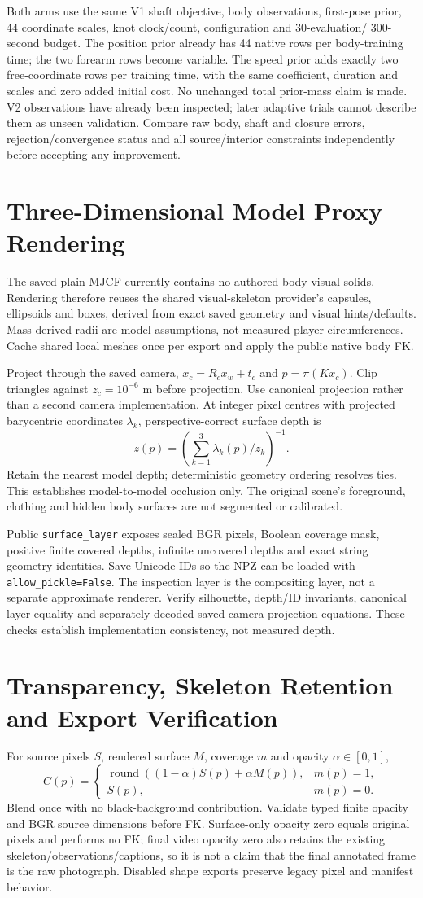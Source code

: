 \documentclass[11pt,letterpaper]{article}
\newcommand{\code}[1]{\nolinkurl{#1}}\newcommand{\hash}[1]{{\footnotesize\nolinkurl{#1}}}
\newcommand{\chapterpage}[1]{\clearpage\section{#1}}
\begin{document}
Both arms use the same V1 shaft objective, body observations, first-pose prior,
44 coordinate scales, knot clock/count, configuration and 30-evaluation/
300-second budget. The position prior already has 44 native rows per body-training time;
the two forearm rows become variable. The speed prior adds exactly two
free-coordinate rows per training time, with the same coefficient, duration
and scales and zero added initial cost. No unchanged total prior-mass claim
is made. V2 observations have already been inspected; later
adaptive trials cannot describe them as unseen validation. Compare raw body,
shaft and closure errors, rejection/convergence status and all source/interior
constraints independently before accepting any improvement.
\chapterpage{Three-Dimensional Model Proxy Rendering}
The saved plain MJCF currently contains no authored body visual solids.
Rendering therefore reuses the shared visual-skeleton provider's capsules,
ellipsoids and boxes, derived from exact saved geometry and visual hints/defaults.
Mass-derived radii are model assumptions, not measured player circumferences.
Cache shared local meshes once per export and apply the public native body FK.

Project through the saved camera, $x_c=R_c x_w+t_c$ and
$p=\pi(Kx_c)$. Clip triangles against $z_c=10^{-6}$ m before projection.
Use canonical projection rather than a second camera implementation.
At integer pixel centres with projected barycentric coordinates $\lambda_k$,
perspective-correct surface depth is
\[
z(p)=\left(\sum_{k=1}^{3}\lambda_k(p)/z_k\right)^{-1}.
\]
Retain the nearest model depth; deterministic geometry ordering resolves ties.
This establishes model-to-model occlusion only. The original scene's foreground,
clothing and hidden body surfaces are not segmented or calibrated.

Public \code{surface_layer} exposes sealed BGR pixels, Boolean coverage mask,
positive finite covered depths, infinite uncovered depths and exact string
geometry identities. Save Unicode IDs so the NPZ can be loaded with
\code{allow_pickle=False}. The inspection layer is the compositing layer,
not a separate approximate renderer. Verify silhouette, depth/ID invariants,
canonical layer equality and separately decoded saved-camera projection equations.
These checks establish implementation consistency, not measured depth.
\chapterpage{Transparency, Skeleton Retention and Export Verification}
For source pixels $S$, rendered surface $M$, coverage $m$ and opacity
$\alpha\in[0,1]$,
\[
C(p)=\begin{cases}\operatorname{round}((1-\alpha)S(p)+\alpha M(p)),&m(p)=1,\\S(p),&m(p)=0.\end{cases}
\]
Blend once with no black-background contribution. Validate typed finite opacity
and BGR source dimensions before FK. Surface-only opacity zero equals original
pixels and performs no FK; final video opacity zero also retains the existing
skeleton/observations/captions, so it is not a claim that the final annotated
frame is the raw photograph. Disabled shape exports preserve legacy pixel and
manifest behavior.
\end{document}
